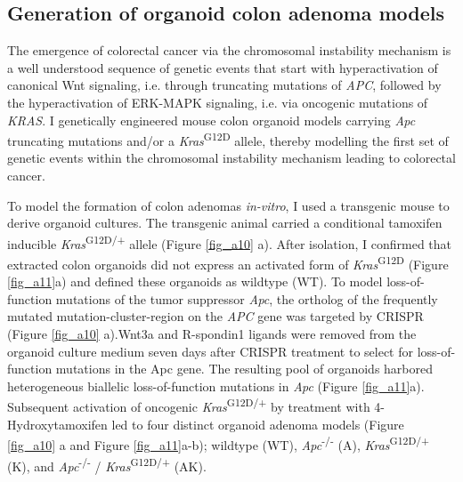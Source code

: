 \begin{flushleft}
\clearpage
\subsection{Generation of organoid colon adenoma models}

The emergence of colorectal cancer via the chromosomal instability mechanism is a well understood sequence of genetic events that start with hyperactivation of canonical Wnt signaling, i.e. through truncating mutations of \textit{APC}, followed by the hyperactivation of ERK-MAPK signaling, i.e. via oncogenic mutations of \textit{KRAS}. I genetically engineered mouse colon organoid models carrying \textit{Apc} truncating mutations and/or a \textit{Kras}\textsuperscript{G12D} allele, thereby modelling the first set of genetic events within the chromosomal instability mechanism leading to colorectal cancer. 
\bigbreak

To model the formation of colon adenomas \textit{in-vitro}, I used a transgenic mouse to derive organoid cultures. The transgenic animal carried a conditional tamoxifen inducible \textit{Kras}\textsuperscript{G12D/+} allele \parencite{jacksonAnalysisLungTumor2001} (Figure \ref{fig_a10} a). After isolation, I confirmed that extracted colon organoids did not express an activated form of \textit{Kras}\textsuperscript{G12D} (Figure \ref{fig_a11}a) and defined these organoids as wildtype (WT). To model loss-of-function mutations of the tumor suppressor \textit{Apc}, the ortholog of the frequently mutated mutation-cluster-region on the \textit{APC} gene was targeted by CRISPR (Figure \ref{fig_a10} a).Wnt3a and R-spondin1 ligands were removed from the organoid culture medium seven days after CRISPR treatment to select for loss-of-function mutations in the Apc gene. The resulting pool of organoids harbored heterogeneous biallelic loss-of-function mutations in \textit{Apc} (Figure \ref{fig_a11}a). Subsequent activation of oncogenic \textit{Kras}\textsuperscript{G12D/+} by treatment with 4-Hydroxytamoxifen led to four distinct organoid adenoma models (Figure \ref{fig_a10} a and Figure \ref{fig_a11}a-b); wildtype (WT), \textit{Apc}\textsuperscript{-/-}
  (A), \textit{Kras}\textsuperscript{G12D/+} (K), and \textit{Apc}\textsuperscript{-/-} / \textit{Kras}\textsuperscript{G12D/+} (AK).



\end{flushleft}
